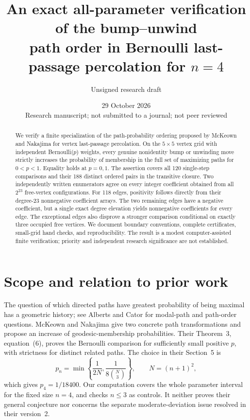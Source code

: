 \documentclass[11pt,a4paper]{article}
\title{An exact all-parameter verification of the bump--unwind\\
path order in Bernoulli last-passage percolation for $n=4$}
\author{Unsigned research draft}
\date{29 October 2026\\\small Research manuscript; not submitted to a journal; not peer reviewed}
\begin{document}
\maketitle
\begin{abstract}
We verify a finite specialization of the path-probability ordering proposed
by McKeown and Nakajima for vertex last-passage percolation. On the
$5\times5$ vertex grid with independent Bernoulli($p$) weights, every
genuine nonidentity bump or unwinding move strictly increases the
probability of membership in the full set of maximizing paths for
$0<p<1$. Equality holds at $p=0,1$. The assertion covers all 120
single-step comparisons and their 188 distinct ordered pairs in the
transitive closure. Two independently written enumerators agree on every
integer coefficient obtained from all $2^{23}$ free-vertex configurations.
For 118 edges, positivity follows directly from their degree-23
nonnegative coefficient arrays. The two remaining edges have a negative
coefficient, but a single exact degree elevation yields nonnegative
coefficients for every edge. The exceptional edges also disprove a
stronger comparison conditional on exactly three occupied free vertices.
We document boundary conventions, complete certificates, small-grid hand
checks, and reproducibility. The result is a modest computer-assisted
finite verification; priority and independent research significance are
not established.
\end{abstract}

\section{Scope and relation to prior work}
The question of which directed paths have greatest probability of being
maximal has a geometric history; see Alberts and Cator \cite[Section~8]{AC}
for modal-path and path-order questions. McKeown and Nakajima \cite{MN}
give two concrete path transformations and propose an increase of
geodesic-membership probabilities. Their Theorem~3, equation~(6), proves
the Bernoulli comparison for sufficiently small positive $p$, with
strictness for distinct related paths. The choice in their Section~5 is
\[
p_n=\min\left\{\frac1{2N},\frac1{8\binom N3}\right\},
\qquad N=(n+1)^2,
\]
which gives $p_4=1/18400$. Our computation covers the whole parameter
interval for the fixed size $n=4$, and checks $n\leq3$ as controls.
It neither proves their general conjecture nor concerns the separate
moderate-deviation issue resolved in their version~2.
\end{document}
